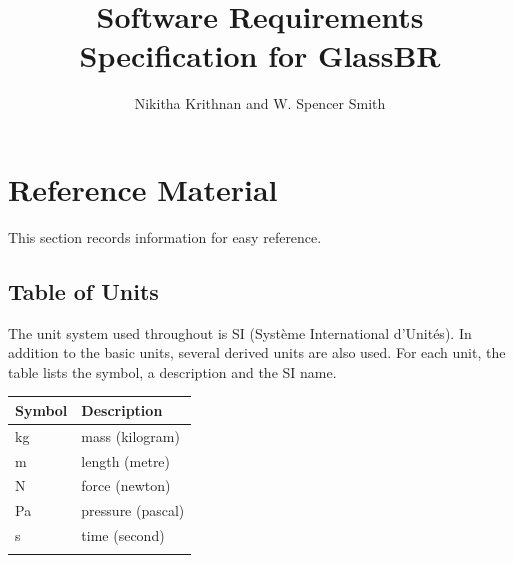 \documentclass[12pt]{article}
\title{Software Requirements Specification for GlassBR}
\author{Nikitha Krithnan and W. Spencer Smith}
\begin{document}
\maketitle
\tableofcontents
\newpage
\section{Reference Material}
\label{Sec:RefMat}
This section records information for easy reference.
\subsection{Table of Units}
\label{Sec:ToU}
The unit system used throughout is SI (Système International d'Unités). In addition to the basic units, several derived units are also used. For each unit, the table lists the symbol, a description and the SI name.
\begin{longtable*}{l l}
\toprule
Symbol & Description
\\
\midrule
kg & mass (kilogram)
\\
m & length (metre)
\\
N & force (newton)
\\
Pa & pressure (pascal)
\\
s & time (second)
\\
\bottomrule
\label{Table:ToU}
\end{longtable*}
\end{document}
